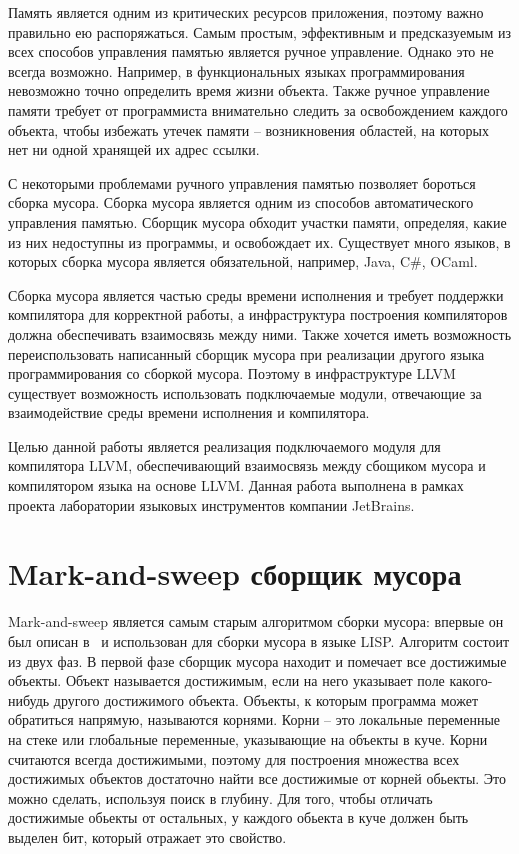 \documentclass[14pt]{extarticle}
\begin{document}
Память является одним из критических ресурсов приложения, поэтому важно правильно ею распоряжаться. 
Самым простым, эффективным и предсказуемым из всех способов управления памятью является ручное управление. 
Однако это не всегда возможно. Например, в функциональных языках программирования невозможно точно
определить время жизни объекта. Также ручное управление памяти требует от программиста внимательно следить
за освобождением каждого объекта, чтобы избежать утечек памяти -- возникновения областей, на которых нет ни одной 
хранящей их адрес ссылки.

С некоторыми проблемами ручного управления памятью позволяет бороться сборка мусора. 
Сборка мусора является одним из способов автоматического управления памятью. Сборщик мусора обходит участки памяти, определяя, 
какие из них недоступны из программы, и освобождает их. Существует много языков, в которых сборка мусора является обязательной,
например, Java, C\#, OCaml. 

Сборка мусора является частью среды времени исполнения и требует поддержки компилятора для корректной работы, а инфраструктура построения компиляторов должна обеспечивать взаимосвязь между ними. Также хочется иметь возможность переиспользовать написанный сборщик мусора при реализации другого языка программирования со сборкой мусора. Поэтому в инфраструктуре LLVM  существует возможность использовать подключаемые модули, отвечающие за взаимодействие среды времени исполнения и компилятора. 

Целью данной работы является реализация подключаемого модуля для компилятора LLVM, обеспечивающий взаимосвязь между 
сбощиком мусора и компилятором языка на основе LLVM.
Данная работа выполнена в рамках проекта лаборатории языковых инструментов компании JetBrains.

\pagebreak
\section{Mark-and-sweep сборщик мусора}
Mark-and-sweep является самым старым алгоритмом сборки мусора: впервые он был описан в~\cite{lisp} и использован для сборки мусора в языке LISP. 
Алгоритм состоит из двух фаз. В первой фазе сборщик мусора находит и помечает все достижимые объекты. Объект называется достижимым, если на него указывает поле какого-нибудь другого достижимого объекта. Объекты, к которым программа может обратиться напрямую, называются корнями. Корни -- это локальные переменные на стеке или глобальные переменные, указывающие на объекты в куче. Корни считаются всегда достижимыми, поэтому для построения множества всех достижимых объектов достаточно найти все достижимые от корней обьекты. Это можно сделать, используя поиск в глубину. Для того, чтобы отличать достижимые обьекты от остальных, у каждого обьекта в куче должен быть выделен бит, который отражает это свойство.
\end{document}
